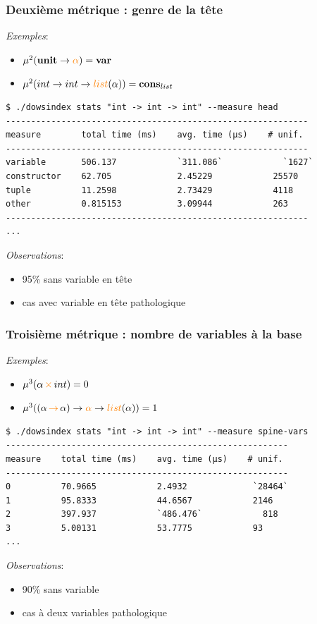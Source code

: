 \documentclass[serif]{beamer}
\newcommand{\exemples}{\textit{Exemples}\xspace}
\newcommand{\observations}{\textit{Observations}\xspace}
\newcommand{\unit}{\bold{unit}}
\begin{document}
\begin{frame}[fragile=singleslide]\frametitle{Deuxième métrique : genre de la tête}
\scriptsize
\exemples :
\begin{itemize}
  \item $\mu^2 (\unit \rightarrow \textcolor{orange}{\alpha}) = \bold{var}$
  \item $\mu^2 (int \rightarrow int \rightarrow \textcolor{orange}{list} (\alpha)) = \bold{cons}_{list}$
\end{itemize}
\bigskip
\begin{lstlisting}
$ ./dowsindex stats "int -> int -> int" --measure head
------------------------------------------------------------
measure        total time (ms)    avg. time (µs)    # unif.
------------------------------------------------------------
variable       506.137            `311.086`            `1627`
constructor    62.705             2.45229            25570
tuple          11.2598            2.73429            4118
other          0.815153           3.09944            263
------------------------------------------------------------
...
\end{lstlisting}
\observations :
\begin{itemize}
  \item 95\% sans variable en tête
  \item cas avec variable en tête pathologique
\end{itemize}
\end{frame}


\begin{frame}[fragile=singleslide]\frametitle{Troisième métrique : nombre de variables à la base}
\scriptsize
\exemples :
\begin{itemize}
  \item $\mu^3 (\alpha \,\textcolor{orange}{\times}\, int) = 0$
  \item $\mu^3 ((\alpha \,\textcolor{orange}{\rightarrow}\, \alpha) \rightarrow \textcolor{orange}{\alpha} \rightarrow \textcolor{orange}{list} (\alpha)) = 1$
\end{itemize}
\bigskip
\begin{lstlisting}
$ ./dowsindex stats "int -> int -> int" --measure spine-vars
--------------------------------------------------------
measure    total time (ms)    avg. time (µs)    # unif.
--------------------------------------------------------
0          70.9665            2.4932             `28464`
1          95.8333            44.6567            2146
2          397.937            `486.476`            818
3          5.00131            53.7775            93
...
\end{lstlisting}
\observations :
\begin{itemize}
  \item 90\% sans variable
  \item cas à deux variables pathologique
\end{itemize}
\end{frame}
\end{document}
